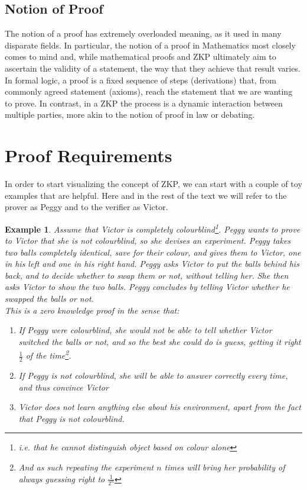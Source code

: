 \documentclass{article}
\newtheorem{example}{Example}
\begin{document}
\subsection{Notion of Proof}
The notion of a proof has extremely overloaded meaning, as it used in many disparate fields. In particular, the notion of a proof in Mathematics most closely comes to mind and, while mathematical proofs and ZKP ultimately aim to ascertain the validity of a statement, the way that they achieve that result varies. In formal logic, a proof is a fixed sequence of steps (derivations) that, from commonly agreed statement (axioms), reach the statement that we are wanting to prove. In contrast, in a ZKP the process is a dynamic interaction between multiple parties, more akin to the notion of proof in law or debating.

\section{Proof Requirements}
\label{proofreq}
In order to start visualizing the concept of ZKP, we can start with a couple of toy examples that are helpful. Here and in the rest of the text we will refer to the prover as Peggy and to the verifier as Victor.
\begin{example}
    Assume that Victor is completely colourblind\footnote{i.e. that he cannot distinguish object based on colour alone}.
    Peggy wants to prove to Victor that she is not colourblind, so she devises an experiment.
    Peggy takes two balls completely identical, save for their colour, and gives them to Victor, one in his left and one in his right hand.
    Peggy asks Victor to put the balls behind his back, and to decide whether to swap them or not, without telling her.
    She then asks Victor to show the two balls.
    Peggy concludes by telling Victor whether he swapped the balls or not.\\
    This is a zero knowledge proof in the sense that:
    \begin{enumerate}
        \item If Peggy were colourblind, she would not be able to tell whether Victor switched the balls or not, and so the best she could do is guess, getting it right $\frac{1}{2}$ of the time\footnote{And as such repeating the experiment $n$ times will bring her probability of always guessing right to $\frac{1}{2^n}$}.
        \item If Peggy is not colourblind, she will be able to answer correctly every time, and thus convince Victor
        \item Victor does not learn anything else about his environment, apart from the fact that Peggy is not colourblind.
    \end{enumerate}
\end{example}
\end{document}

